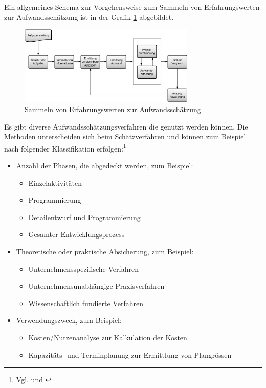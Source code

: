 Ein allgemeines Schema zur Vorgehensweise zum Sammeln von Erfahrungswerten zur 
Aufwandsschätzung ist in der Grafik \ref{pic:02_schema_aufwandsschaetzung}
abgebildet.

\clearpage

\begin{figure}[htbp]
\begin{center}
\includegraphics[width=0.75\textwidth,angle=0]{./bilder/theorie/02_schema_aufwandsschaetzung.pdf}
\caption[Sammeln von Erfahrungswerten zur Aufwandsschätzung]{Sammeln von Erfahrungswerten zur Aufwandsschätzung\footnotemark}
\label{pic:02_schema_aufwandsschaetzung}
\end{center}
\end{figure}

Es gibt diverse Aufwandsschätzungsverfahren die genutzt werden können. Die Methoden unterscheiden
sich beim Schätzverfahren und können zum Beispiel nach folgender Klassifikation 
erfolgen:\footnote{Vgl. \citealp*{noth1986aufwandschaetzung} und \citealp*{knoell1991aufwandsschaetzung}}

\begin{itemize}
    \item Anzahl der Phasen, die abgedeckt werden, zum Beispiel:
    \begin{itemize}
        \item Einzelaktivitäten
        \item Programmierung
        \item Detailentwurf und Programmierung
        \item Gesamter Entwicklungsprozess
    \end{itemize}
    \item Theoretische oder praktische Absicherung, zum Beispiel:
    \begin{itemize}
        \item Unternehmensspezifische Verfahren
        \item Unternehmensunabhängige Praxisverfahren
        \item Wissenschaftlich fundierte Verfahren
    \end{itemize}
    \item Verwendungszweck, zum Beispiel:
    \begin{itemize}
        \item Kosten/Nutzenanalyse zur Kalkulation der Kosten
        \item Kapazitäts- und Terminplanung zur Ermittlung von Plangrössen
    \end{itemize}
\end{itemize}

